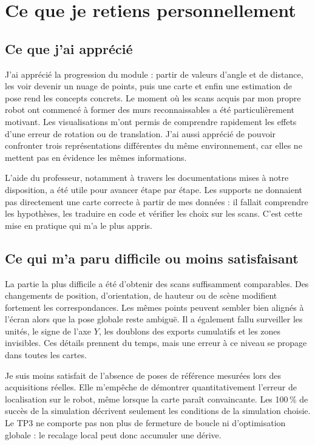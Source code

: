 \documentclass[11pt,a4paper]{article}
\begin{document}
\section{Ce que je retiens personnellement}
\subsection{Ce que j'ai apprécié}
J'ai apprécié la progression du module : partir de valeurs d'angle et de distance, les voir devenir un nuage de points, puis une carte et enfin une estimation de pose rend les concepts concrets. Le moment où les scans acquis par mon propre robot ont commencé à former des murs reconnaissables a été particulièrement motivant. Les visualisations m'ont permis de comprendre rapidement les effets d'une erreur de rotation ou de translation. J'ai aussi apprécié de pouvoir confronter trois représentations différentes du même environnement, car elles ne mettent pas en évidence les mêmes informations.

L'aide du professeur, notamment à travers les documentations mises à notre disposition, a été utile pour avancer étape par étape. Les supports ne donnaient pas directement une carte correcte à partir de mes données : il fallait comprendre les hypothèses, les traduire en code et vérifier les choix sur les scans. C'est cette mise en pratique qui m'a le plus appris.

\subsection{Ce qui m'a paru difficile ou moins satisfaisant}
La partie la plus difficile a été d'obtenir des scans suffisamment comparables. Des changements de position, d'orientation, de hauteur ou de scène modifient fortement les correspondances. Les mêmes points peuvent sembler bien alignés à l'écran alors que la pose globale reste ambiguë. Il a également fallu surveiller les unités, le signe de l'axe $Y$, les doublons des exports cumulatifs et les zones invisibles. Ces détails prennent du temps, mais une erreur à ce niveau se propage dans toutes les cartes.

Je suis moins satisfait de l'absence de poses de référence mesurées lors des acquisitions réelles. Elle m'empêche de démontrer quantitativement l'erreur de localisation sur le robot, même lorsque la carte paraît convaincante. Les 100\,\% de succès de la simulation décrivent seulement les conditions de la simulation choisie. Le TP3 ne comporte pas non plus de fermeture de boucle ni d'optimisation globale : le recalage local peut donc accumuler une dérive.
\end{document}
